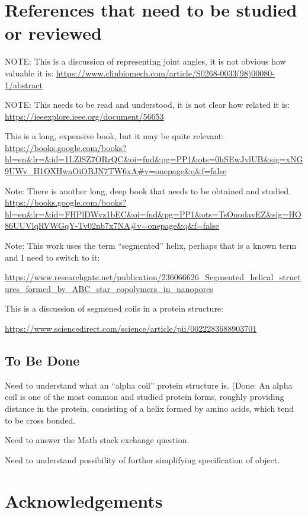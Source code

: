 \documentclass[11pt]{article}
\begin{document}
{\section{References that need to be studied or reviewed}

NOTE: This is a discussion of representing joint angles, it is not obvious how valuable it is:
\url{https://www.clinbiomech.com/article/S0268-0033(98)00080-1/abstract}

NOTE: This needs to be read and understood, it is not clear how related it is:
\url{https://ieeexplore.ieee.org/document/56653}

This is a long, expensive book, but it may be quite relevant\cite{hyde1996language}:
\url{https://books.google.com/books?hl=en&lr=&id=1LZlSZ7ORrQC&oi=fnd&pg=PP1&ots=0hSEwJvlUB&sig=xNG9UWv_H1OXHwaOiOBJN7TW6xA#v=onepage&q&f=false}

Note: There is another long, deep book that needs to be obtained and studied\cite{sadoc2006geometrical}.
\url{https://books.google.com/books?hl=en&lr=&id=FHPlDWvz1bEC&oi=fnd&pg=PP1&ots=TsOnodavEZ&sig=HO86UUVlqRVWGqY-Tv02nb7x7NA#v=onepage&q&f=false}


Note: This work uses the term ``segmented'' helix, perhaps that is a known term and I need to switch to it:

\url{https://www.researchgate.net/publication/236066626_Segmented_helical_structures_formed_by_ABC_star_copolymers_in_nanopores}

This is a discussion of segmened coils in a protein structure:

\url{https://www.sciencedirect.com/science/article/pii/0022283688903701}

\subsection{To Be Done}

Need to understand what an ``alpha coil'' protein structure is. (Done: An alpha coil is one of the most common
and studied protein forms, roughly providing distance in the protein, consisting of a helix formed by
amino acids, which tend to be cross bonded.

Need to answer the Math stack  exchange question.

Need to understand possibility of further simplifying specification of object.

\section{Acknowledgements}

}
\end{document}
